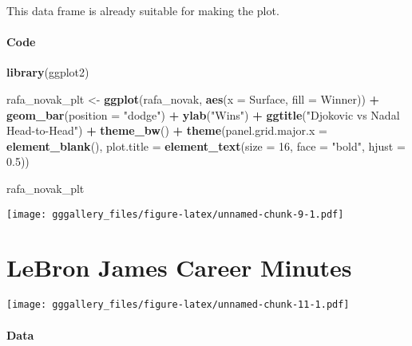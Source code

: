 \documentclass[]{book}
\newenvironment{Shaded}{\begin{snugshade}}{\end{snugshade}}
\newcommand{\DataTypeTok}[1]{\textcolor[rgb]{0.13,0.29,0.53}{#1}}
\newcommand{\DecValTok}[1]{\textcolor[rgb]{0.00,0.00,0.81}{#1}}
\newcommand{\FloatTok}[1]{\textcolor[rgb]{0.00,0.00,0.81}{#1}}
\newcommand{\KeywordTok}[1]{\textcolor[rgb]{0.13,0.29,0.53}{\textbf{#1}}}
\newcommand{\NormalTok}[1]{#1}
\newcommand{\OperatorTok}[1]{\textcolor[rgb]{0.81,0.36,0.00}{\textbf{#1}}}
\newcommand{\StringTok}[1]{\textcolor[rgb]{0.31,0.60,0.02}{#1}}
\begin{document}
This data frame is already suitable for making the plot.

\hypertarget{djokovicnadalcode}{%
\subsubsection*{Code}\label{djokovicnadalcode}}

\begin{Shaded}
\begin{Highlighting}[]
\KeywordTok{library}\NormalTok{(ggplot2)}

\NormalTok{rafa_novak_plt <-}\StringTok{ }\KeywordTok{ggplot}\NormalTok{(rafa_novak, }\KeywordTok{aes}\NormalTok{(}\DataTypeTok{x =}\NormalTok{ Surface, }\DataTypeTok{fill =}\NormalTok{ Winner)) }\OperatorTok{+}\StringTok{ }
\StringTok{  }\KeywordTok{geom_bar}\NormalTok{(}\DataTypeTok{position =} \StringTok{"dodge"}\NormalTok{) }\OperatorTok{+}\StringTok{ }
\StringTok{  }\KeywordTok{ylab}\NormalTok{(}\StringTok{"Wins"}\NormalTok{) }\OperatorTok{+}\StringTok{ }
\StringTok{  }\KeywordTok{ggtitle}\NormalTok{(}\StringTok{"Djokovic vs Nadal Head-to-Head"}\NormalTok{) }\OperatorTok{+}\StringTok{ }
\StringTok{  }\KeywordTok{theme_bw}\NormalTok{() }\OperatorTok{+}
\StringTok{  }\KeywordTok{theme}\NormalTok{(}\DataTypeTok{panel.grid.major.x =} \KeywordTok{element_blank}\NormalTok{(),}
        \DataTypeTok{plot.title =} \KeywordTok{element_text}\NormalTok{(}\DataTypeTok{size =} \DecValTok{16}\NormalTok{, }\DataTypeTok{face =} \StringTok{"bold"}\NormalTok{, }\DataTypeTok{hjust =} \FloatTok{0.5}\NormalTok{))}

\NormalTok{rafa_novak_plt}
\end{Highlighting}
\end{Shaded}

\texttt{[image: gggallery\_files/figure-latex/unnamed-chunk-9-1.pdf]}

\hypertarget{lebron}{%
\chapter*{LeBron James Career Minutes}\label{lebron}}

\texttt{[image: gggallery\_files/figure-latex/unnamed-chunk-11-1.pdf]}

\hypertarget{lebrondata}{%
\subsubsection*{Data}\label{lebrondata}}
\end{document}
